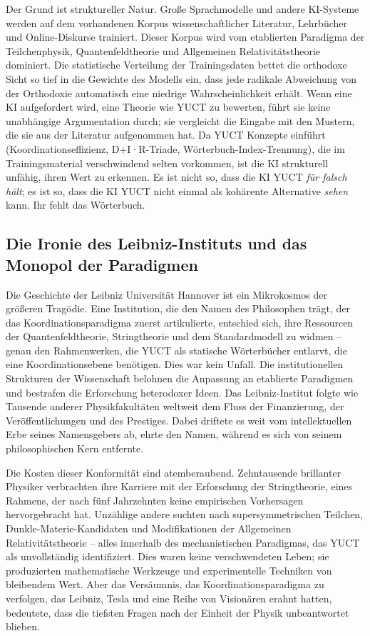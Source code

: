\documentclass[12pt,a4paper]{article}
\begin{document}
	Der Grund ist struktureller Natur. Große Sprachmodelle und andere KI-Systeme werden auf dem vorhandenen Korpus wissenschaftlicher Literatur, Lehrbücher und Online-Diskurse trainiert. Dieser Korpus wird vom etablierten Paradigma der Teilchenphysik, Quantenfeldtheorie und Allgemeinen Relativitätstheorie dominiert. Die statistische Verteilung der Trainingsdaten bettet die orthodoxe Sicht so tief in die Gewichte des Modells ein, dass jede radikale Abweichung von der Orthodoxie automatisch eine niedrige Wahrscheinlichkeit erhält. Wenn eine KI aufgefordert wird, eine Theorie wie YUCT zu bewerten, führt sie keine unabhängige Argumentation durch; sie vergleicht die Eingabe mit den Mustern, die sie aus der Literatur aufgenommen hat. Da YUCT Konzepte einführt (Koordinationseffizienz, D+I·R-Triade, Wörterbuch-Index-Trennung), die im Trainingsmaterial verschwindend selten vorkommen, ist die KI strukturell unfähig, ihren Wert zu erkennen. Es ist nicht so, dass die KI YUCT \emph{für falsch hält}; es ist so, dass die KI YUCT nicht einmal als kohärente Alternative \emph{sehen} kann. Ihr fehlt das Wörterbuch.
	
	\subsection{Die Ironie des Leibniz-Instituts und das Monopol der Paradigmen}
	
	Die Geschichte der Leibniz Universität Hannover ist ein Mikrokosmos der größeren Tragödie. Eine Institution, die den Namen des Philosophen trägt, der das Koordinationsparadigma zuerst artikulierte, entschied sich, ihre Ressourcen der Quantenfeldtheorie, Stringtheorie und dem Standardmodell zu widmen – genau den Rahmenwerken, die YUCT als statische Wörterbücher entlarvt, die eine Koordinationsebene benötigen. Dies war kein Unfall. Die institutionellen Strukturen der Wissenschaft belohnen die Anpassung an etablierte Paradigmen und bestrafen die Erforschung heterodoxer Ideen. Das Leibniz-Institut folgte wie Tausende anderer Physikfakultäten weltweit dem Fluss der Finanzierung, der Veröffentlichungen und des Prestiges. Dabei driftete es weit vom intellektuellen Erbe seines Namensgebers ab, ehrte den Namen, während es sich von seinem philosophischen Kern entfernte.
	
	Die Kosten dieser Konformität sind atemberaubend. Zehntausende brillanter Physiker verbrachten ihre Karriere mit der Erforschung der Stringtheorie, eines Rahmens, der nach fünf Jahrzehnten keine empirischen Vorhersagen hervorgebracht hat. Unzählige andere suchten nach supersymmetrischen Teilchen, Dunkle-Materie-Kandidaten und Modifikationen der Allgemeinen Relativitätstheorie – alles innerhalb des mechanistischen Paradigmas, das YUCT als unvollständig identifiziert. Dies waren keine verschwendeten Leben; sie produzierten mathematische Werkzeuge und experimentelle Techniken von bleibendem Wert. Aber das Versäumnis, das Koordinationsparadigma zu verfolgen, das Leibniz, Tesla und eine Reihe von Visionären erahnt hatten, bedeutete, dass die tiefsten Fragen nach der Einheit der Physik unbeantwortet blieben.
	
\end{document}
